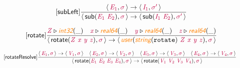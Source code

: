 \documentclass[10pt,leqno,fleqn]{article}
\newcommand{\artVariable}[1]{\mbox{\color{purple}\em #1\/}}
\newcommand{\artConstructor}[1]{\mbox{\sf #1}}
\newcommand{\artCaseInsensitiveLiteral}[1]{\mbox{\tt #1}}
\newcommand{\artSpecial}[1]{\mbox{\color{orange}\sf\em #1}}
\begin{document}
\begin{equation}
\tag*{[\artConstructor{\sf subLeft}]}
\begin{split}\frac{\langle\, \artVariable{E$_{1}$}, \artVariable{$\sigma$}\,\rangle \rightarrow \langle\, \artVariable{I$_{1}$}, \artVariable{$\sigma$\/$^\prime$}\,\rangle }{\langle\, \artConstructor{\sf sub}(\artVariable{E$_{1}$}\ \artVariable{E$_{2}$}), \artVariable{$\sigma$}\,\rangle \rightarrow \langle\, \artConstructor{\sf sub}(\artVariable{I$_{1}$}\ \artVariable{E$_{2}$}), \artVariable{$\sigma$\/$^\prime$}\,\rangle }
\end{split}
\end{equation}

\begin{equation}
\tag*{[\artConstructor{\sf rotate}]}
\begin{split}\frac{ \artVariable{Z}\triangleright \artSpecial{int32}(\_) \quad  \artVariable{x}\triangleright \artSpecial{real64}(\_) \quad  \artVariable{y}\triangleright \artSpecial{real64}(\_) \quad  \artVariable{z}\triangleright \artSpecial{real64}(\_) }{\langle\, \artConstructor{\sf rotate}(\artVariable{Z}\ \artVariable{x}\ \artVariable{y}\ \artVariable{z}), \artVariable{$\sigma$}\,\rangle \rightarrow \langle\, \artSpecial{user}(\artSpecial{string}(\artCaseInsensitiveLiteral{rotate})\ \artVariable{Z}\ \artVariable{x}\ \artVariable{y}\ \artVariable{z}), \artVariable{$\sigma$}\,\rangle }
\end{split}
\end{equation}

\begin{equation}
\tag*{[\artConstructor{\sf rotateResolve}]}
\begin{split}\frac{\langle\, \artVariable{E$_{1}$}, \artVariable{$\sigma$}\,\rangle \rightarrow \langle\, \artVariable{V$_{1}$}, \artVariable{$\sigma$}\,\rangle \quad \langle\, \artVariable{E$_{2}$}, \artVariable{$\sigma$}\,\rangle \rightarrow \langle\, \artVariable{V$_{2}$}, \artVariable{$\sigma$}\,\rangle \quad \langle\, \artVariable{E$_{3}$}, \artVariable{$\sigma$}\,\rangle \rightarrow \langle\, \artVariable{V$_{3}$}, \artVariable{$\sigma$}\,\rangle \quad \langle\, \artVariable{E$_{4}$}, \artVariable{$\sigma$}\,\rangle \rightarrow \langle\, \artVariable{V$_{4}$}, \artVariable{$\sigma$}\,\rangle }{\langle\, \artConstructor{\sf rotate}(\artVariable{E$_{1}$}\ \artVariable{E$_{2}$}\ \artVariable{E$_{3}$}\ \artVariable{E$_{4}$}), \artVariable{$\sigma$}\,\rangle \rightarrow \langle\, \artConstructor{\sf rotate}(\artVariable{V$_{1}$}\ \artVariable{V$_{2}$}\ \artVariable{V$_{3}$}\ \artVariable{V$_{4}$}), \artVariable{$\sigma$}\,\rangle }
\end{split}
\end{equation}
\end{document}
